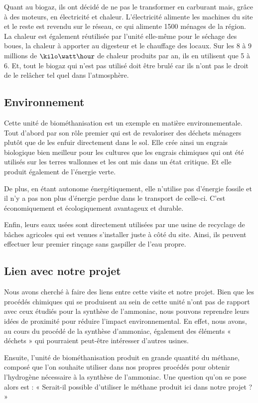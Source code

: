 Quant au biogaz, ils ont décidé de ne pas le transformer en carburant mais, grâce à des moteurs, en électricité et chaleur. L'électricité alimente les machines du site et le reste est revendu sur le réseau, ce qui alimente 1500 ménages de la région. La chaleur est également réutilisée par l'unité elle-même pour le séchage des boues, la chaleur à apporter au digesteur et le chauffage des locaux. Sur les 8 à 9 millions de $\kilo\watt\hour$ de chaleur produits par an, ils en utilisent que 5 à 6. Et, tout le biogaz qui n'est pas utilisé doit être brulé car ils n'ont pas le droit de le relâcher tel quel dans l'atmosphère.

\subsection{Environnement}
Cette unité de biométhanisation est un exemple en matière environnementale.
Tout d'abord par son rôle premier qui est de revaloriser des déchets ménagers plutôt que de les enfuir directement dans le sol. Elle crée ainsi un engrais biologique bien meilleur pour les cultures que les engrais chimiques qui ont été utilisés sur les terres wallonnes et les ont mis dans un état critique. Et elle produit également de l'énergie verte.

De plus, en étant autonome énergétiquement, elle n'utilise pas d'énergie fossile et il n'y a pas non plus d'énergie perdue dans le transport de celle-ci. C'est économiquement et écologiquement avantageux et durable.

Enfin, leurs eaux usées sont directement utilisées par une usine de recyclage de bâches agricoles qui est venues s'installer juste à côté du site. Ainsi, ils peuvent effectuer leur premier rinçage sans gaspiller de l'eau propre.

\subsection{Lien avec notre projet}
Nous avons cherché à faire des liens entre cette visite et notre projet. Bien que les procédés chimiques qui se produisent au sein de cette unité n'ont pas de rapport avec ceux étudiés pour la synthèse de l'ammoniac, nous pouvons reprendre leurs idées de proximité pour réduire l'impact environnemental. En effet, nous avons, au cours du procédé de la synthèse d'ammoniac, également des éléments « déchets » qui pourraient peut-être intéresser d'autres usines.


Ensuite, l'unité de biométhanisation produit en grande quantité du méthane, composé que l'on souhaite utiliser dans nos propres procédés pour obtenir l'hydrogène nécessaire à la synthèse de l'ammoniac. Une question qu'on se pose alors est : « Serait-il possible d'utiliser le méthane produit ici dans notre projet ? »


